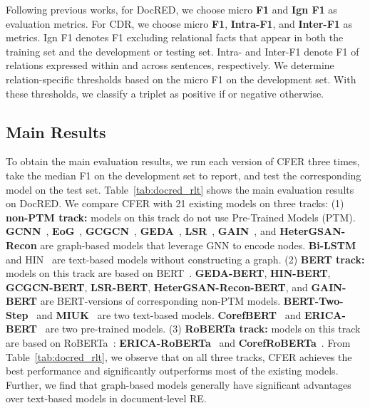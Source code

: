 \documentclass{article}
\newcommand{\citep}{\cite}
\begin{document}
Following previous works, for DocRED, we choose micro \textbf{F1} and \textbf{Ign F1} as evaluation metrics. 
For CDR, we choose micro \textbf{F1}, \textbf{Intra-F1}, and \textbf{Inter-F1} as metrics. 
Ign F1 denotes F1 excluding relational facts that appear in both the training set and the development or testing set. 
Intra- and Inter-F1 denote F1 of relations expressed within and across sentences, respectively. 
We determine relation-specific thresholds  based on the micro F1 on the development set. 
With these thresholds, we classify a triplet  as positive if  or negative otherwise. 

\subsection{Main Results}

To obtain the main evaluation results, we run each version of CFER three times, take the median F1 on the development set to report, and test the corresponding model on the test set. 
Table~\ref{tab:docred_rlt} shows the main evaluation results on DocRED. 
We compare CFER with 21 existing models on three tracks: 
(1) \textbf{non-PTM track:}
models on this track do not use Pre-Trained Models (PTM). 
\textbf{GCNN}~\citep{gcnn}, \textbf{EoG}~\citep{eog}, \textbf{GCGCN}~\citep{gcgcn}, \textbf{GEDA}~\citep{geda}, \textbf{LSR}~\citep{lsr},  \textbf{GAIN}~\citep{gain}, and \textbf{HeterGSAN-Recon} are graph-based models that leverage GNN to encode nodes. 
\textbf{Bi-LSTM}~\citep{docred} and HIN~\citep{hin} are text-based models without constructing a graph. 
(2) \textbf{BERT track:}
models on this track are based on BERT~\citep{bert}. 
\textbf{GEDA-BERT}, \textbf{HIN-BERT}, \textbf{GCGCN-BERT}, \textbf{LSR-BERT}, \textbf{HeterGSAN-Recon-BERT}, and \textbf{GAIN-BERT} are BERT-versions of corresponding non-PTM models. 
\textbf{BERT-Two-Step}~\citep{bert_two_step} and \textbf{MIUK}~\citep{miuk} are two text-based models. 
\textbf{CorefBERT}~\citep{coref_bert} and \textbf{ERICA-BERT}~\citep{erica} are two pre-trained models. 
(3) \textbf{RoBERTa track:}
models on this track are based on RoBERTa~\citep{roberta}: \textbf{ERICA-RoBERTa}~\citep{erica} and \textbf{CorefRoBERTa}~\citep{coref_bert}.  
From Table~\ref{tab:docred_rlt}, we observe that 
on all three tracks, CFER achieves the best performance and significantly outperforms most of the existing models. 
Further, we find that graph-based models generally have significant advantages over text-based models in document-level RE. 
\end{document}
